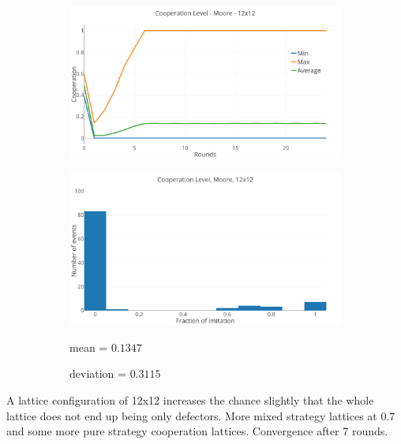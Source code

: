 \documentclass[a4paper, 11pt]{article}
\begin{document}
\begin{figure}[H]
\begin{subfigure}{.75\textwidth}
	\includegraphics[width=1\linewidth]{PDMoore12x12}
\end{subfigure}

\begin{subfigure}{.75\textwidth}
	\includegraphics[width=1\linewidth]{PDMoore12x12HG}
\end{subfigure}%
\begin{subfigure}{.25\textwidth}
	mean = $0.1347$
	
	deviation = $0.3115$
\end{subfigure}

\end{figure}

A lattice configuration of 12x12 increases the chance slightly that the whole lattice does not end up being only defectors. More mixed strategy lattices at $0.7$ and some more pure strategy cooperation lattices. Convergence after 7 rounds.

\newpage

\end{document}
